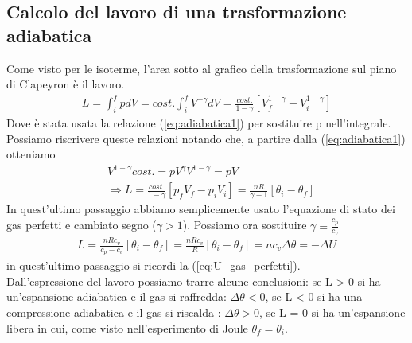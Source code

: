 \documentclass[10pt,a4paper]{article}
\begin{document}
\subsection{Calcolo del lavoro di una trasformazione adiabatica}
Come visto per le isoterme, l'area sotto al grafico della trasformazione sul piano di Clapeyron è il lavoro. 
\begin{align*}
	L = \int_{i}^{f} p dV = cost. \int_{i}^{f} V^{-\gamma} dV = \frac{cost.}{1 - \gamma}[V_f^{1-\gamma}-V_i^{1-\gamma}]
\end{align*}
Dove è stata usata la relazione (\ref{eq:adiabatica1}) per sostituire p nell'integrale.\\
Possiamo riscrivere queste relazioni notando che, a partire dalla (\ref{eq:adiabatica1}) otteniamo
\begin{align*}
	&V^{1- \gamma} cost. = pV^{\gamma} V^{1- \gamma} = pV\\
	&\Rightarrow L =  \frac{cost.}{1 - \gamma}[p_f V_f-p_i V_i] = \frac{n R}{\gamma - 1}[\theta_i - \theta_f]
\end{align*}
In quest'ultimo passaggio abbiamo semplicemente usato l'equazione di stato dei gas perfetti e cambiato segno ($\gamma > 1$). Possiamo ora sostituire $\gamma \equiv \frac{c_p}{c_v}$ 
\begin{align*}
L = \frac{n R c_v}{c_p - c_v} [\theta_i - \theta_f] = \frac{n R c_v}{R} [\theta_i - \theta_f] = n c_v \Delta \theta = -\Delta U
\end{align*}
in quest'ultimo passaggio si ricordi la (\ref{eq:U_gas_perfetti}).\\
Dall'espressione del lavoro possiamo trarre alcune conclusioni: se L > 0 si ha un'espansione adiabatica e il gas si raffredda: \(\Delta \theta< 0\), se L < 0 si ha una compressione adiabatica e il gas si riscalda : \(\Delta \theta > 0\), se L = 0 si ha un'espansione libera in cui, come visto nell'esperimento di Joule \(\theta_f = \theta_i\).
\end{document}
